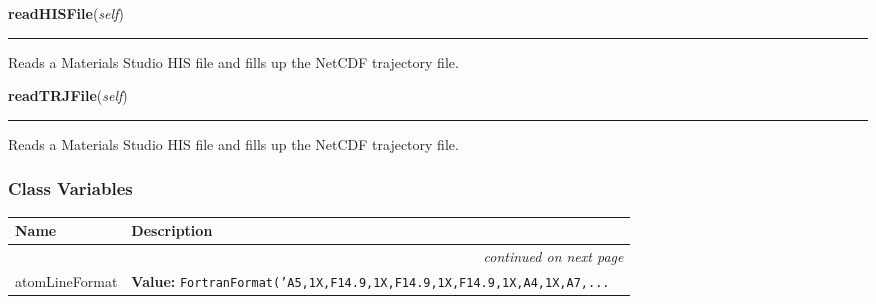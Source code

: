     \vspace{0.5ex}

\hspace{.8\funcindent}\begin{boxedminipage}{\funcwidth}

    \raggedright \textbf{readHISFile}(\textit{self})

    \vspace{-1.5ex}

    \rule{\textwidth}{0.5\fboxrule}
\setlength{\parskip}{2ex}
    Reads a Materials Studio HIS file and fills up the NetCDF trajectory 
    file.

\setlength{\parskip}{1ex}
    \end{boxedminipage}

    \label{nMOLDYN:Core:IOFiles:MaterialsStudioConverter:readTRJFile}

    \vspace{0.5ex}

\hspace{.8\funcindent}\begin{boxedminipage}{\funcwidth}

    \raggedright \textbf{readTRJFile}(\textit{self})

    \vspace{-1.5ex}

    \rule{\textwidth}{0.5\fboxrule}
\setlength{\parskip}{2ex}
    Reads a Materials Studio HIS file and fills up the NetCDF trajectory 
    file.

\setlength{\parskip}{1ex}
    \end{boxedminipage}



  \subsubsection{Class Variables}

    \vspace{-1cm}
\hspace{\varindent}\begin{longtable}{|p{\varnamewidth}|p{\vardescrwidth}|l}
\cline{1-2}
\cline{1-2} \centering \textbf{Name} & \centering \textbf{Description}& \\
\cline{1-2}
\endhead\cline{1-2}\multicolumn{3}{r}{\small\textit{continued on next page}}\\\endfoot\cline{1-2}
\endlastfoot\raggedright a\-t\-o\-m\-L\-i\-n\-e\-F\-o\-r\-m\-a\-t\- & \raggedright \textbf{Value:} 
{\tt FortranFormat('A5,1X,F14.9,1X,F14.9,1X,F14.9,1X,A4,1X,A7,\texttt{...}}&\\
\cline{1-2}
\end{longtable}

